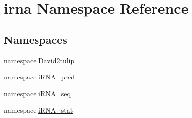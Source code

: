 \hypertarget{namespaceirna}{
\section{irna \-Namespace \-Reference}
\label{namespaceirna}
}
\subsection*{\-Namespaces}
\begin{DoxyCompactItemize}
\item 
namespace \hyperlink{namespaceirna_1_1David2tulip}{\-David2tulip}
\item 
namespace \hyperlink{namespaceirna_1_1iRNA__pred}{i\-R\-N\-A\-\_\-pred}
\item 
namespace \hyperlink{namespaceirna_1_1iRNA__seq}{i\-R\-N\-A\-\_\-seq}
\item 
namespace \hyperlink{namespaceirna_1_1iRNA__stat}{i\-R\-N\-A\-\_\-stat}
\end{DoxyCompactItemize}
